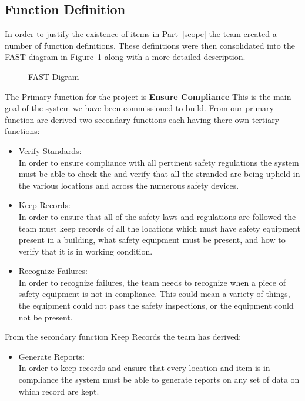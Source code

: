 \documentclass[Letter,11pt]{article}
\begin{document}
	\subsection{Function Definition} 
		In order to justify the existence of items in Part~\ref{scope} the team created a number of function definitions. These definitions were then consolidated into the FAST diagram in Figure~\ref{fast1} along with a more detailed description.
		\begin{figure}[h]
			\centering
			
			\caption{\label{fast1} FAST Digram}
		\end{figure}
		The Primary function for the project is \textbf{Ensure Compliance} This is the main goal of the system we have been commissioned to build. From our primary function are derived two secondary functions each having there own tertiary functions:
		\begin{itemize}
			\item Verify Standards:\\
			In order to ensure compliance with all pertinent safety regulations the system must be able to check the and verify that all the stranded are being upheld in the various locations and across the numerous safety devices.
			\item Keep Records:\\
			In order to ensure that all of the safety laws and regulations are followed the team must keep records of all the locations which must have safety equipment present in a building, what safety equipment must be present, and how to verify that it is in working condition.  

			\item Recognize Failures:\\
			In order to recognize failures, the team needs to recognize when a piece of safety equipment is not in compliance. This could mean a variety of things, the equipment could not pass the safety inspections, or the equipment could not be present.   

		\end{itemize}
		From the secondary function Keep Records the team has derived: 
		\begin{itemize}
			\item Generate Reports:\\
			In order to keep records and ensure that every location and item is in compliance the system must be able to generate reports on any set of data on which record are kept. 
		\end{itemize}
\end{document}
